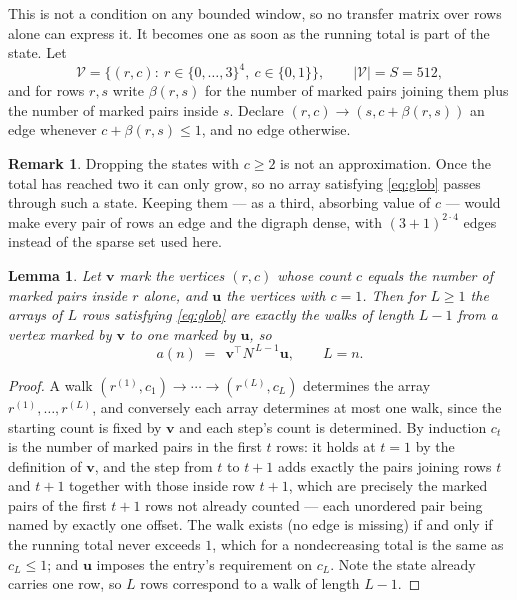 \documentclass[11pt,a4paper]{article}
\theoremstyle{plain}
\newtheorem{lemma}[theorem]{Lemma}
\theoremstyle{definition}
\newtheorem{remark}[theorem]{Remark}
\begin{document}
This is not a condition on any bounded window, so no transfer matrix over rows alone can
express it. It becomes one as soon as the running total is part of the state. Let
\[
\mathcal V=\bigl\{(r,c):\ r\in\{0,\dots,3\}^{4},\ c\in\{0,1\}\bigr\},
\qquad |\mathcal V|=S=512,
\]
and for rows $r,s$ write $\beta(r,s)$ for the number of marked pairs joining them plus the
number of marked pairs inside $s$. Declare $(r,c)\to(s,c+\beta(r,s))$ an edge whenever
$c+\beta(r,s)\le1$, and no edge otherwise.

\begin{remark}
Dropping the states with $c\ge2$ is not an approximation. Once the total has reached two it
can only grow, so no array satisfying \eqref{eq:glob} passes through such a state. Keeping
them --- as a third, absorbing value of $c$ --- would make every pair of rows an edge and
the digraph dense, with $(3+1)^{2\cdot4}$ edges instead of the sparse set used here.
\end{remark}

\begin{lemma}\label{lem:walk}
Let $\mathbf{v}$ mark the vertices $(r,c)$ whose count $c$ equals the number of marked pairs
inside $r$ alone, and $\mathbf{u}$ the vertices with $c=1$. Then for $L\ge1$ the arrays
of $L$ rows satisfying \eqref{eq:glob} are exactly the walks of length $L-1$ from a
vertex marked by $\mathbf{v}$ to one marked by $\mathbf{u}$, so
\[
a(n)\;=\;\,\mathbf{v}^{\!\top}N^{\,L-1}\mathbf{u},\qquad L=n .
\]
\end{lemma}

\begin{proof}
A walk $(r^{(1)},c_1)\to\cdots\to(r^{(L)},c_L)$ determines the array
$r^{(1)},\dots,r^{(L)}$, and conversely each array determines at most one walk, since the
starting count is fixed by $\mathbf{v}$ and each step's count is determined. By induction
$c_t$ is the number of marked pairs in the first $t$ rows: it holds at $t=1$ by the
definition of $\mathbf{v}$, and the step from $t$ to $t+1$ adds exactly the pairs joining
rows $t$ and $t+1$ together with those inside row $t+1$, which are precisely the marked
pairs of the first $t+1$ rows not already counted --- each unordered pair being named by
exactly one offset. The walk exists (no edge is missing) if and only if the running total
never exceeds $1$, which for a nondecreasing total is the same as $c_L\le1$; and
$\mathbf{u}$ imposes the entry's requirement on $c_L$. Note the state already carries one
row, so $L$ rows correspond to a walk of length $L-1$.
\end{proof}
\end{document}
